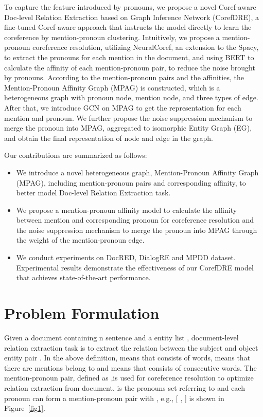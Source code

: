 \documentclass{article}
\begin{document}
To capture the feature introduced by pronouns, we propose a novel Coref-aware Doc-level Relation Extraction based on Graph Inference Network (CorefDRE), a fine-tuned Coref-aware approach that instructs the model directly to learn the coreference by mention-pronoun clustering. Intuitively, we propose a mention-pronoun coreference resolution, utilizing NeuralCoref, an extension to the Spacy, to extract the pronouns for each mention in the document, and using BERT to calculate the affinity of each mention-pronoun pair, to reduce the noise brought by pronouns. According to the mention-pronoun pairs and the affinities, the Mention-Pronoun Affinity Graph (MPAG) is constructed, which is a heterogeneous graph with pronoun node, mention node, and three types of edge. After that, we introduce GCN on MPAG to get the representation for each mention and pronoun. We further propose the noise suppression mechanism to merge the pronoun into MPAG, aggregated to isomorphic Entity Graph (EG), and obtain the final representation of node and edge in the graph.

Our contributions are summarized as follows: 
\begin{itemize}

\item We introduce a novel heterogeneous graph, Mention-Pronoun Affinity Graph (MPAG), including mention-pronoun pairs and corresponding affinity, to better model Doc-level Relation Extraction task.

\item We propose a mention-pronoun affinity model to calculate the affinity between mention and corresponding pronoun for coreference resolution and the noise suppression mechanism to merge the pronoun into MPAG through the weight of the mention-pronoun edge.


\item We conduct experiments on DocRED, DialogRE and MPDD dataset. Experimental results demonstrate the effectiveness of our CorefDRE model that achieves state-of-the-art performance.

\end{itemize}

\section{Problem Formulation}

Given a document  containing n sentence  and a entity list , document-level relation extraction task is to extract the relation  between the subject and object entity pair . In the above definition,  means that  consists of  words,  means that there are  mentions belong to  and  means that  consists of  consecutive words.
The mention-pronoun pair, defined as ,is used for coreference resolution to optimize relation extraction from document.  is the pronouns set referring to  and each pronoun  can form a mention-pronoun pair with , e.g., [ , ] is shown in Figure~\ref{fig1}.
\end{document}
